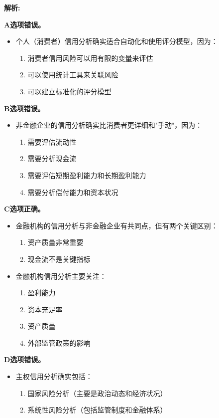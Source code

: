\documentclass{article}
\newenvironment{explanation}
{\textbf{解析:}\par}
{\par}
\begin{document}
\begin{explanation}
    \textbf{A选项错误。}
    \begin{itemize}
        \item 个人（消费者）信用分析确实适合自动化和使用评分模型，因为：
        \begin{enumerate}
            \item 消费者信用风险可以用有限的变量来评估
            \item 可以使用统计工具来关联风险
            \item 可以建立标准化的评分模型
        \end{enumerate}
    \end{itemize}
    
    \textbf{B选项错误。}
    \begin{itemize}
        \item 非金融企业的信用分析确实比消费者更详细和"手动"，因为：
        \begin{enumerate}
            \item 需要评估流动性
            \item 需要分析现金流
            \item 需要评估短期盈利能力和长期盈利能力
            \item 需要分析偿付能力和资本状况
        \end{enumerate}
    \end{itemize}
    
    \textbf{C选项正确。}
    \begin{itemize}
        \item 金融机构的信用分析与非金融企业有共同点，但有两个关键区别：
        \begin{enumerate}
            \item 资产质量非常重要
            \item 现金流不是关键指标
        \end{enumerate}
        \item 金融机构信用分析主要关注：
        \begin{enumerate}
            \item 盈利能力
            \item 资本充足率
            \item 资产质量
            \item 外部监管政策的影响
        \end{enumerate}
    \end{itemize}
    
    \textbf{D选项错误。}
    \begin{itemize}
        \item 主权信用分析确实包括：
        \begin{enumerate}
            \item 国家风险分析（主要是政治动态和经济状况）
            \item 系统性风险分析（包括监管制度和金融体系）
        \end{enumerate}
    \end{itemize}
\end{explanation}
\end{document}
